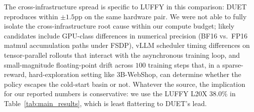 The cross-infrastructure spread is specific to LUFFY in this comparison: DUET reproduces within $\pm 1.5$pp on the same hardware pair. We were not able to fully isolate the cross-infrastructure root cause within our compute budget; likely candidates include GPU-class differences in numerical precision (BF16 vs.\ FP16 matmul accumulation paths under FSDP), vLLM scheduler timing differences on tensor-parallel rollouts that interact with the asynchronous training loop, and small-magnitude floating-point drift across $100$ training steps that, in a sparse-reward, hard-exploration setting like 3B-WebShop, can determine whether the policy escapes the cold-start basin or not. Whatever the source, the implication for our reported numbers is conservative: we use the LUFFY L20X $38.0\%$ in Table~\ref{tab:main_results}, which is least flattering to DUET's lead.
